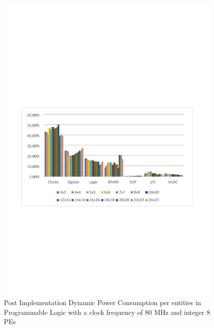 \begin{figure}[!htbp]
\centering
\captionsetup{justification=centering}
\includegraphics[scale=0.7,angle=0]{./figure/graphs/power_pldyn_div_int8_freq_80mhz.pdf}
\caption{Post Implementation Dynamic Power Consumption per entities in Programmable Logic with a clock frequency of 80 MHz and integer 8 PEs}
\label{fig:dynpowint8ent80}
\end{figure}
